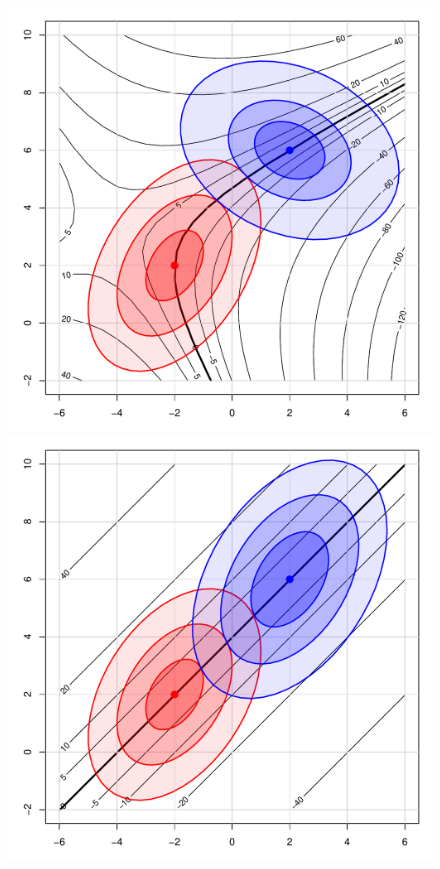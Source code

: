 \begin{figure}[htb]
 \begin{minipage}[b]{.49\linewidth}
  \centering
  \includegraphics[width=1\linewidth]{fig/kiss-demo2a}
 \end{minipage}%
 \hfill
 \begin{minipage}[b]{.49\linewidth}
  \centering
  \includegraphics[width=1\linewidth]{fig/kiss-demo2b}

\end{minipage}
\end{figure}
